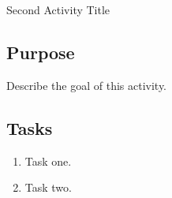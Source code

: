 \documentclass[11pt,a4paper]{article}
\begin{document}
\begin{activity}{Second Activity Title}

\subsection*{Purpose}

Describe the goal of this activity.

\subsection*{Tasks}
\begin{enumerate}
  \item Task one.
  \item Task two.
\end{enumerate}

\end{activity}
\end{document}
